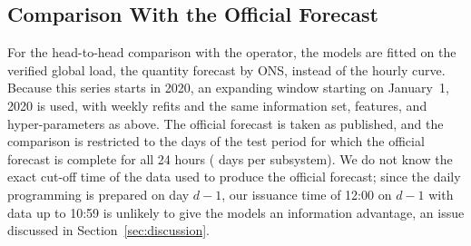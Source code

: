 \subsection{Comparison With the Official Forecast}
\label{sec:protocol_ons}
For the head-to-head comparison with the operator, the models are fitted on the verified global load, the quantity forecast by ONS, instead of the hourly curve. Because this series starts in 2020, an expanding window starting on January~1, 2020 is used, with weekly refits and the same information set, features, and hyper-parameters as above. The official forecast is taken as published, and the comparison is restricted to the days of the test period for which the official forecast is complete for all 24 hours (\NdaysONS{} days per subsystem). We do not know the exact cut-off time of the data used to produce the official forecast; since the daily programming is prepared on day $d-1$, our issuance time of 12:00 on $d-1$ with data up to 10:59 is unlikely to give the models an information advantage, an issue discussed in Section~\ref{sec:discussion}.
